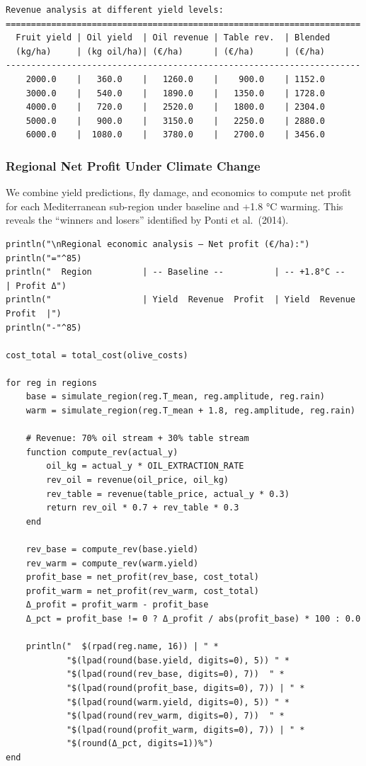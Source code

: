 \begin{verbatim}
Revenue analysis at different yield levels:
======================================================================
  Fruit yield | Oil yield  | Oil revenue | Table rev.  | Blended
  (kg/ha)     | (kg oil/ha)| (€/ha)      | (€/ha)      | (€/ha)
----------------------------------------------------------------------
    2000.0    |   360.0    |   1260.0    |    900.0    | 1152.0
    3000.0    |   540.0    |   1890.0    |   1350.0    | 1728.0
    4000.0    |   720.0    |   2520.0    |   1800.0    | 2304.0
    5000.0    |   900.0    |   3150.0    |   2250.0    | 2880.0
    6000.0    |  1080.0    |   3780.0    |   2700.0    | 3456.0
\end{verbatim}



\subsubsection{Regional Net Profit Under Climate Change}



\label{1401092669354793238}{}


We combine yield predictions, fly damage, and economics to compute net profit for each Mediterranean sub-region under baseline and +1.8 °C warming. This reveals the “winners and losers” identified by Ponti et al.~(2014).




\begin{verbatim}
println("\nRegional economic analysis — Net profit (€/ha):")
println("="^85)
println("  Region          | -- Baseline --          | -- +1.8°C --            | Profit Δ")
println("                  | Yield  Revenue  Profit  | Yield  Revenue  Profit  |")
println("-"^85)

cost_total = total_cost(olive_costs)

for reg in regions
    base = simulate_region(reg.T_mean, reg.amplitude, reg.rain)
    warm = simulate_region(reg.T_mean + 1.8, reg.amplitude, reg.rain)

    # Revenue: 70% oil stream + 30% table stream
    function compute_rev(actual_y)
        oil_kg = actual_y * OIL_EXTRACTION_RATE
        rev_oil = revenue(oil_price, oil_kg)
        rev_table = revenue(table_price, actual_y * 0.3)
        return rev_oil * 0.7 + rev_table * 0.3
    end

    rev_base = compute_rev(base.yield)
    rev_warm = compute_rev(warm.yield)
    profit_base = net_profit(rev_base, cost_total)
    profit_warm = net_profit(rev_warm, cost_total)
    Δ_profit = profit_warm - profit_base
    Δ_pct = profit_base != 0 ? Δ_profit / abs(profit_base) * 100 : 0.0

    println("  $(rpad(reg.name, 16)) | " *
            "$(lpad(round(base.yield, digits=0), 5)) " *
            "$(lpad(round(rev_base, digits=0), 7))  " *
            "$(lpad(round(profit_base, digits=0), 7)) | " *
            "$(lpad(round(warm.yield, digits=0), 5)) " *
            "$(lpad(round(rev_warm, digits=0), 7))  " *
            "$(lpad(round(profit_warm, digits=0), 7)) | " *
            "$(round(Δ_pct, digits=1))%")
end
\end{verbatim}




